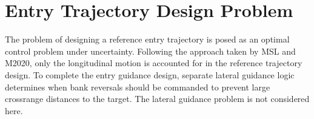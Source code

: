 \documentclass[journal ]{new-aiaa}
\newcommand{\mean}{\mathbf{m}}
\newcommand{\cov}{C}
\newcommand{\sample}{\ensuremath{\mathbf{z}}}
\begin{document}

\section*{Entry Trajectory Design Problem}
The problem of designing a reference entry trajectory is posed as an optimal control problem under uncertainty. Following the approach taken by MSL and M2020, only the longitudinal motion is accounted for in the reference trajectory design. To complete the entry guidance design, separate lateral guidance logic determines when bank reversals should be commanded to prevent large crossrange distances to the target. The lateral guidance problem is not considered here.
\end{document}
